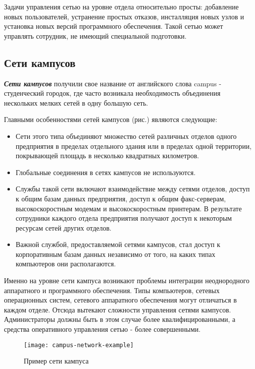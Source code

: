 Задачи управления сетью на уровне отдела относительно просты: добавление новых пользователей, устранение простых отказов, инсталляция новых узлов и установка новых версий программного обеспечения.
Такой сетью может управлять сотрудник, не имеющий специальной подготовки.

\subsection{Сети кампусов}

\textbf{\textit{Сети кампусов}} получили свое название от английского слова campus - студенческий городок, где часто возникала необходимость объединения нескольких мелких сетей в одну большую сеть.

Главными особенностями сетей кампусов (рис.) являются следующие:
\begin{itemize}
    \item Сети этого типа объединяют множество сетей различных отделов одного предприятия в пределах отдельного здания или в пределах одной территории, покрывающей площадь в несколько квадратных километров.
    \item Глобальные соединения в сетях кампусов не используются.
    \item Службы такой сети включают взаимодействие между сетями отделов, доступ к общим базам данных предприятия, доступ к общим факс-серверам, высокоскоростным модемам и высокоскоростным принтерам.
        В результате сотрудники каждого отдела предприятия получают доступ к некоторым ресурсам сетей других отделов.
    \item Важной службой, предоставляемой сетями кампусов, стал доступ к корпоративным базам данных независимо от того, на каких типах компьютеров они располагаются.
\end{itemize}

Именно на уровне сети кампуса возникают проблемы интеграции неоднородного аппаратного и программного обеспечения.
Типы компьютеров, сетевых операционных систем, сетевого аппаратного обеспечения могут отличаться в каждом отделе.
Отсюда вытекают сложности управления сетями кампусов.
Администраторы должны быть в этом случае более квалифицированными, а средства оперативного управления сетью - более совершенными.

\begin{figure}
    \centering
    \texttt{[image: campus-network-example]}
    \caption{Пример сети кампуса}
    \label{fig:campus-network-example}
\end{figure}

